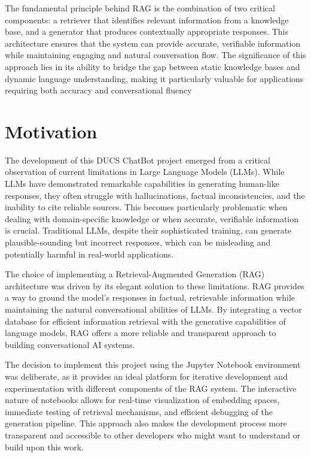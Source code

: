 \documentclass[12pt,a4paper]{report}
\begin{document}
The fundamental principle behind RAG is the combination of two critical components: a retriever that identifies relevant information from a knowledge base, and a generator that produces contextually appropriate responses. This architecture ensures that the system can provide accurate, verifiable information while maintaining engaging and natural conversation flow. The significance of this approach lies in its ability to bridge the gap between static knowledge bases and dynamic language understanding, making it particularly valuable for applications requiring both accuracy and conversational fluency

\section{Motivation}

The development of this DUCS ChatBot project emerged from a critical observation of current limitations in Large Language Models (LLMs). While LLMs have demonstrated remarkable capabilities in generating human-like responses, they often struggle with hallucinations, factual inconsistencies, and the inability to cite reliable sources. This becomes particularly problematic when dealing with domain-specific knowledge or when accurate, verifiable information is crucial. Traditional LLMs, despite their sophisticated training, can generate plausible-sounding but incorrect responses, which can be misleading and potentially harmful in real-world applications.

The choice of implementing a Retrieval-Augmented Generation (RAG) architecture was driven by its elegant solution to these limitations. RAG provides a way to ground the model's responses in factual, retrievable information while maintaining the natural conversational abilities of LLMs. By integrating a vector database for efficient information retrieval with the generative capabilities of language models, RAG offers a more reliable and transparent approach to building conversational AI systems.

The decision to implement this project using the Jupyter Notebook environment was deliberate, as it provides an ideal platform for iterative development and experimentation with different components of the RAG system. The interactive nature of notebooks allows for real-time visualization of embedding spaces, immediate testing of retrieval mechanisms, and efficient debugging of the generation pipeline. This approach also makes the development process more transparent and accessible to other developers who might want to understand or build upon this work.
\end{document}
